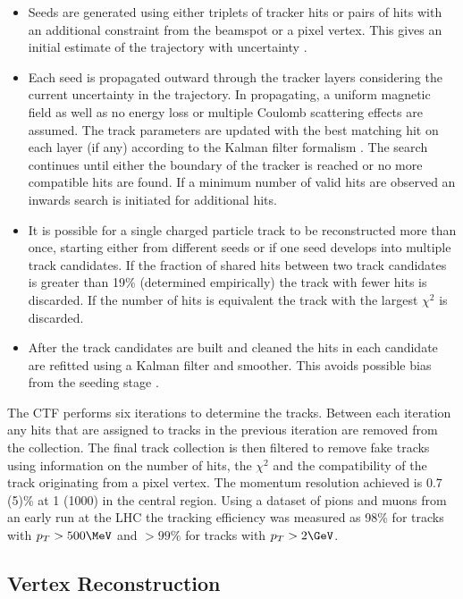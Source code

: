 \begin{itemize}
\item Seeds are generated using either triplets of tracker hits or pairs of hits with an additional constraint 
from the beamspot or a pixel vertex. This gives an initial estimate of the trajectory with uncertainty \cite{tracker_early}.
\item Each seed is propagated outward through the tracker layers considering the current uncertainty in the trajectory.
In propagating, a uniform magnetic field as well as no energy loss or multiple Coulomb scattering effects are assumed.
The track parameters are updated with the best matching hit on each layer (if any) according to the Kalman filter formalism \cite{tracker_vertex}.
The search continues until either the boundary of the tracker is reached or no more compatible hits are found. If a minimum number
of valid hits are observed an inwards search is initiated for additional hits\cite{tracker_early}.
\item It is possible for a single charged particle track to be reconstructed more than once, starting either from different seeds or if
one seed develops into multiple track candidates. If the fraction of shared hits between two track candidates is greater
than 19\% (determined empirically) the track with fewer hits is discarded. If the number of hits is equivalent the track with
 the largest $\chi^2$ is discarded\cite{tracker_vertex}.
\item After the track candidates are built and cleaned the hits in each candidate are refitted using a Kalman filter and smoother. This 
avoids possible bias from the seeding stage \cite{tracker_vertex}.
\end{itemize}

The CTF performs six iterations to determine the tracks. Between each iteration any hits that are assigned to tracks in the
previous iteration are removed from the collection. The final track collection is then filtered to remove fake tracks using 
information on the number of hits, the $\chi^2$ and the compatibility of the track originating from a pixel vertex. The momentum 
resolution achieved is 0.7 (5)\% at 1 (1000) \GeV in the central region\cite{tracker_early}. Using a dataset of pions and muons from an early run 
at the LHC the tracking efficiency was measured as 98\% for tracks with $p_T > 500\MeV$ and $>99\%$ for tracks with $p_T > 2\GeV$\cite{tracker_eff}.

\subsection{Vertex Reconstruction}

